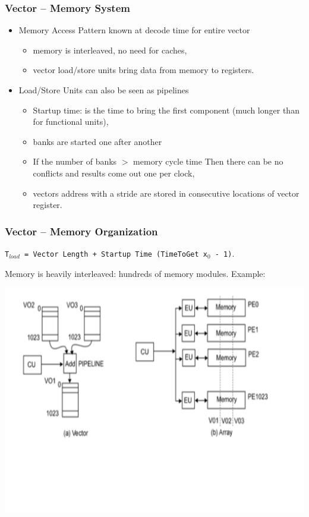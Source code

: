 \documentclass{beamer}
\begin{document}
\begin{frame}[fragile,t]
\frametitle{Vector -- Memory System}

\begin{itemize}
    \item Memory Access Pattern known at decode time for entire vector\smallskip
    \begin{itemize}
        \item memory is interleaved, no need for caches,\smallskip
        \item vector load/store units bring data from memory to registers.
    \end  {itemize}\medskip

    \item Load/Store Units can also be seen as pipelines\smallskip
    \begin{itemize}
        \item Startup time: is the time to bring the first component
                (much longer than for functional units),\smallskip
        \item banks are started one after another\smallskip
        \item If the number of banks $>$ memory cycle time Then 
                there can be no conflicts and results come 
                out one per clock,\smallskip
        \item vectors address with a stride are stored in consecutive
                locations of vector register. 
    \end  {itemize}

\end  {itemize}
\end{frame}


\begin{frame}[fragile,t]
\frametitle{Vector -- Memory Organization}

{\tt T$_{load}$ = Vector Length + Startup Time (TimeToGet x$_0$ - 1)}.\medskip

Memory is heavily interleaved: hundreds of memory modules.
Example:

\includegraphics[width=59ex]{Ch1Figs/VectorMachine}

\end{frame}
\end{document}
